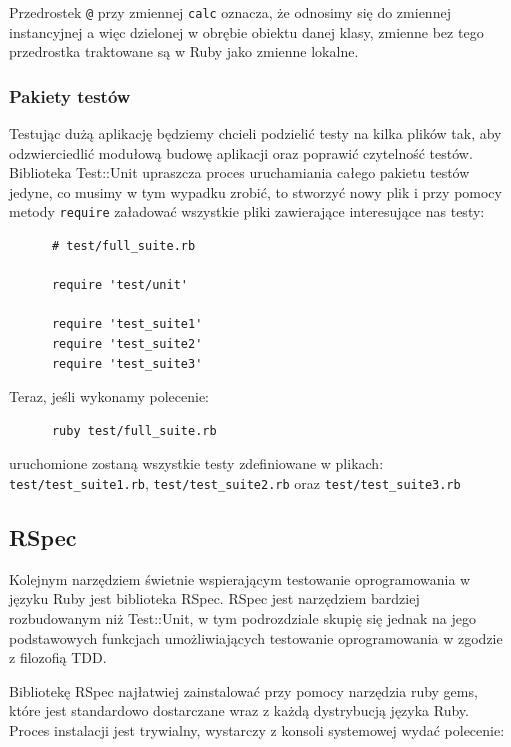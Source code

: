     Przedrostek \verb+@+ przy zmiennej \verb+calc+ oznacza, że odnosimy się do zmiennej instancyjnej a więc dzielonej w obrębie obiektu danej klasy, zmienne bez tego przedrostka traktowane są w Ruby jako zmienne lokalne.
    
    \subsubsection{Pakiety testów}
    Testując dużą aplikację będziemy chcieli podzielić testy na kilka plików tak, aby odzwierciedlić modułową budowę aplikacji oraz poprawić czytelność testów. Biblioteka Test::Unit upraszcza proces uruchamiania całego pakietu testów jedyne, co musimy w tym wypadku zrobić, to stworzyć nowy plik i przy pomocy metody \verb+require+ załadować wszystkie pliki zawierające interesujące nas testy:
    
    \begin{verbatim}
      # test/full_suite.rb
      
      require 'test/unit'
      
      require 'test_suite1'
      require 'test_suite2'
      require 'test_suite3'
    \end{verbatim}
    
    Teraz, jeśli wykonamy polecenie:
    
    \begin{verbatim}
      ruby test/full_suite.rb
    \end{verbatim}
    
    uruchomione zostaną wszystkie testy zdefiniowane w plikach: \verb+test/test_suite1.rb+, \verb+test/test_suite2.rb+ oraz \verb+test/test_suite3.rb+
    
    \subsection{RSpec}
    
    Kolejnym narzędziem świetnie wspierającym testowanie oprogramowania w języku Ruby jest biblioteka RSpec. RSpec jest narzędziem bardziej rozbudowanym niż Test::Unit, w tym podrozdziale skupię się jednak na jego podstawowych funkcjach umożliwiających testowanie oprogramowania w zgodzie z filozofią TDD.
    
    Bibliotekę RSpec najłatwiej zainstalować przy pomocy narzędzia ruby gems, które jest standardowo dostarczane wraz z każdą dystrybucją języka Ruby. Proces instalacji jest trywialny, wystarczy z konsoli systemowej wydać polecenie:
    
